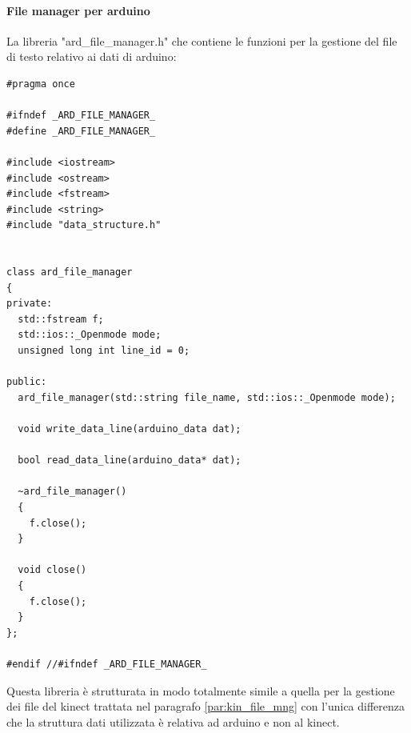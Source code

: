 \documentclass[10pt,a4paper]{article}
\begin{document}
\paragraph{File manager per arduino}
La libreria "ard\_file\_manager.h" che contiene le funzioni per la gestione del file di testo relativo ai dati di arduino:
\begin{lstlisting}[style=mycpp, caption=ard\_file\_manager.h, captionpos=b]
#pragma once

#ifndef _ARD_FILE_MANAGER_
#define _ARD_FILE_MANAGER_

#include <iostream>
#include <ostream>
#include <fstream>
#include <string>
#include "data_structure.h"


class ard_file_manager
{
private:
  std::fstream f;
  std::ios::_Openmode mode;
  unsigned long int line_id = 0;

public:
  ard_file_manager(std::string file_name, std::ios::_Openmode mode);

  void write_data_line(arduino_data dat);

  bool read_data_line(arduino_data* dat);

  ~ard_file_manager()
  {
    f.close();
  }

  void close()
  {
    f.close();
  }
};

#endif //#ifndef _ARD_FILE_MANAGER_
\end{lstlisting}
Questa libreria \`e strutturata in modo totalmente simile a quella per la gestione dei file del kinect trattata nel paragrafo \ref{par:kin_file_mng} con l'unica differenza che la struttura dati utilizzata \`e relativa ad arduino e non al kinect.
\\
%
%
\end{document}
